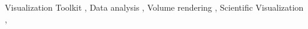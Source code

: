 \documentclass[preprint,10pt,a4paper,5p,authoryear,twocolumn]{elsarticle}
\begin{document}
\begin{frontmatter}


  

  

  \begin{keyword}
    Visualization Toolkit \sep
    Data analysis \sep
    Volume rendering \sep
    Scientific Visualization \sep
  \end{keyword}










\end{frontmatter}

\end{document}
